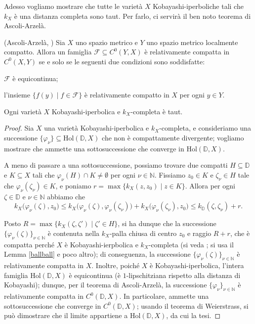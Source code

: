 Adesso vogliamo mostrare che tutte le varietà $X$ Kobayashi-iperboliche  tali che $k_X$ è una distanza completa sono taut. Per farlo, ci servirà il ben noto teorema di Ascoli-Arzelà.

\begin{thm}
    (Ascoli-Arzelà, \cite[Chapter 7, Theorem 17]{Ke}) Sia $X$ uno spazio metrico e $Y$ uno spazio metrico localmente compatto. Allora un famiglia $\mathcal{F}\subseteq C^0(Y,X)$ è relativamente compatta in $C^0(X,Y)$ se e solo se le seguenti due condizioni sono soddisfatte:
    \begin{nlist}
        \item $\mathcal{F}$ è equicontinua;
        \item l'insieme $\{f(y)\mid f\in\mathcal{F}\}$ è relativamente compatto in $X$ per ogni $y\in Y$.
    \end{nlist}
\end{thm}

\begin{prop} \label{comp_is_taut}
    Ogni varietà $X$ Kobayashi-iperbolica e $k_X$-completa è taut.
\end{prop}

\begin{proof}
    Sia $X$ una varietà Kobayashi-iperbolica e $k_X$-completa, e consideriamo una successione $\{\varphi_\nu\}\subseteq\text{Hol}(\mathbb{D},X)$ che non è compattamente divergente; vogliamo mostrare che ammette una sottosuccessione che converge in $\text{Hol}(\mathbb{D},X)$.

    A meno di passare a una sottosuccessione, possiamo trovare due compatti $H\subseteq\mathbb{D}$ e $K\subseteq X$ tali che $\varphi_\nu(H)\cap K\not=\emptyset$ per ogni $\nu\in\mathbb{N}$. Fissiamo $z_0\in K$ e $\zeta_\nu\in H$ tale che $\varphi_\nu(\zeta_\nu)\in K$, e poniamo $r=\max\{k_X(z,z_0)\mid z\in K\}$. Allora per ogni $\zeta\in\mathbb{D}$ e $\nu\in\mathbb{N}$ abbiamo che
    $$k_X\big(\varphi_\nu(\zeta),z_0\big) \le k_X\big(\varphi_\nu(\zeta),\varphi_\nu(\zeta_\nu)\big)+k_X\big(\varphi_\nu(\zeta_\nu),z_0\big) \le k_{\mathbb{D}} (\zeta,\zeta_\nu)+r.$$

    Posto $R=\max\{k_X(\zeta,\zeta')\mid \zeta'\in H\}$, si ha dunque che la successione $\{\varphi_\nu(\zeta)\}_{\nu\in\mathbb{N}}$ è contenuta nella $k_X$-palla chiusa di centro $z_0$ e raggio $R+r$, che è compatta perché $X$ è Kobayashi-ierpbolica e $k_X$-completa (si veda \cite[Chapter 2, Paragraph 2.3, Proposition 2.3.17]{A1}; si usa il Lemma \ref{ballball} e poco altro); di conseguenza, la successione $\{\varphi_\nu(\zeta)\}_{\nu\in\mathbb{N}}$ è relativamente compatta in $X$. Inoltre, poiché $X$ è Kobayashi-iperbolica, l'intera famiglia $\text{Hol}(\mathbb{D},X)$ è equicontinua (è $1$-lipschitziana rispetto alla distanza di Kobayashi); dunque, per il teorema di Ascoli-Arzelà, la successione $\{\varphi_\nu\}_{\nu\in\mathbb{N}}$ è relativamente compatta in $C^0(\mathbb{D},X)$. In particolare, ammette una sottosuccessione che converge in $C^0(\mathbb{D},X)$; usando il teorema di Weierstrass, si può dimostrare che il limite appartiene a $\text{Hol}(\mathbb{D},X)$, da cui la tesi.
\end{proof}

